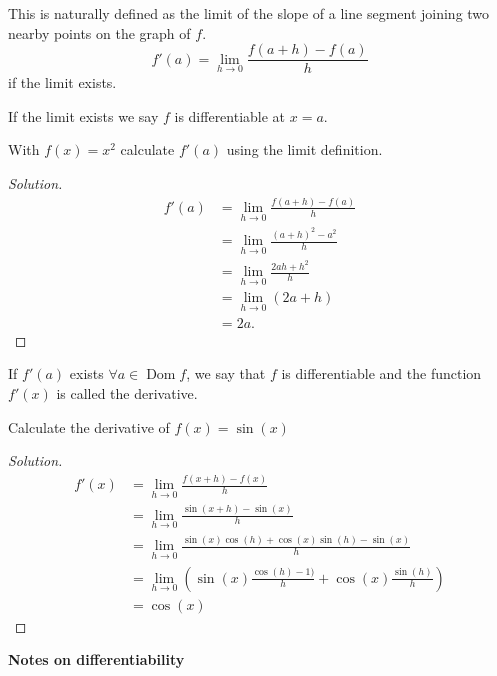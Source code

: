 \documentclass[10pt, a4paper]{article}
\DeclareMathOperator{\Dom}{Dom}
\begin{document}
This is naturally defined as the limit of the slope of a line segment joining two nearby points on the graph of $f$.
\[
f'(a) = \lim_{h \rightarrow 0}\frac{f(a + h) - f(a)}{h}
\]
if the limit exists.

If the limit exists we say $f$ is differentiable at $x = a$.

\begin{example}
    With $f(x) = x ^ 2$ calculate $f'(a)$ using the limit definition.
    \begin{proof}[Solution]\renewcommand{\qedsymbol}{}
        \begin{align*}
        f'(a) &= \lim_{h \rightarrow 0}\frac{f(a + h) - f(a)}{h} \\
        &= \lim_{h \rightarrow 0}\frac{(a + h) ^ 2 - a ^ 2}{h} \\
        &= \lim_{h \rightarrow 0}\frac{2ah + h ^ 2}{h} \\
        &= \lim_{h \rightarrow 0}(2a + h) \\
        &= 2a.
        \end{align*}
    \end{proof}
\end{example}
If $f'(a)$ exists $\forall a \in \Dom f$, we say that $f$ is differentiable and the function $f'(x)$ is called the derivative.

\begin{example}
    Calculate the derivative of $f(x) = \sin(x)$
    \begin{proof}[Solution]\renewcommand{\qedsymbol}{}
        \begin{align*}
            f'(x) &= \lim_{h \rightarrow 0}\frac{f(x + h) - f(x)}{h} \\
            &= \lim_{h \rightarrow 0}\frac{\sin(x + h) - \sin(x)}{h} \\
            &= \lim_{h \rightarrow 0}\frac{\sin(x)\cos(h) + \cos(x)\sin(h) - \sin(x)}{h} \\
            &= \lim_{h \rightarrow 0}\left(\sin(x)\frac{\cos(h) - 1)}{h} + \cos(x)\frac{\sin(h)}{h}\right) \\
            &= \cos(x)
        \end{align*}
    \end{proof}
\end{example}

\textbf{Notes on differentiability}
\end{document}
